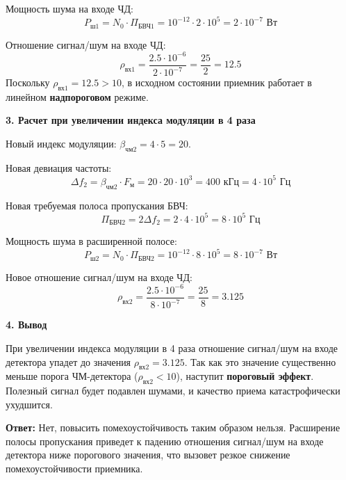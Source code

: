 Мощность шума на входе ЧД:
\begin{equation*}
    P_{\text{ш1}} = N_0 \cdot \Pi_{\text{БВЧ1}} = 10^{-12} \cdot 2 \cdot 10^5 = 2 \cdot 10^{-7} \text{ Вт}
\end{equation*}

Отношение сигнал/шум на входе ЧД:
\begin{equation*}
    \rho_{\text{вх1}} = \frac{2.5 \cdot 10^{-6}}{2 \cdot 10^{-7}} = \frac{25}{2} = 12.5
\end{equation*}
Поскольку $\rho_{\text{вх1}} = 12.5 > 10$, в исходном состоянии приемник работает в линейном \textbf{надпороговом} режиме.

\vspace{1em}
\textbf{3. Расчет при увеличении индекса модуляции в 4 раза}

Новый индекс модуляции: $\beta_{\text{чм2}} = 4 \cdot 5 = 20$.

Новая девиация частоты:
\begin{equation*}
    \Delta f_2 = \beta_{\text{чм2}} \cdot F_{\text{м}} = 20 \cdot 20 \cdot 10^3 = 400 \text{ кГц} = 4 \cdot 10^5 \text{ Гц}
\end{equation*}

Новая требуемая полоса пропускания БВЧ:
\begin{equation*}
    \Pi_{\text{БВЧ2}} = 2\Delta f_2 = 2 \cdot 4 \cdot 10^5 = 8 \cdot 10^5 \text{ Гц}
\end{equation*}

Мощность шума в расширенной полосе:
\begin{equation*}
    P_{\text{ш2}} = N_0 \cdot \Pi_{\text{БВЧ2}} = 10^{-12} \cdot 8 \cdot 10^5 = 8 \cdot 10^{-7} \text{ Вт}
\end{equation*}

Новое отношение сигнал/шум на входе ЧД:
\begin{equation*}
    \rho_{\text{вх2}} = \frac{2.5 \cdot 10^{-6}}{8 \cdot 10^{-7}} = \frac{25}{8} = 3.125
\end{equation*}

\vspace{1em}
\textbf{4. Вывод}

При увеличении индекса модуляции в 4 раза отношение сигнал/шум на входе детектора упадет до значения $\rho_{\text{вх2}} = 3.125$. 
Так как это значение существенно меньше порога ЧМ-детектора ($\rho_{\text{вх2}} < 10$), наступит \textbf{пороговый эффект}. Полезный сигнал будет подавлен шумами, и качество приема катастрофически ухудшится.

\textbf{Ответ:} Нет, повысить помехоустойчивость таким образом нельзя. Расширение полосы пропускания приведет к падению отношения сигнал/шум на входе детектора ниже порогового значения, что вызовет резкое снижение помехоустойчивости приемника.